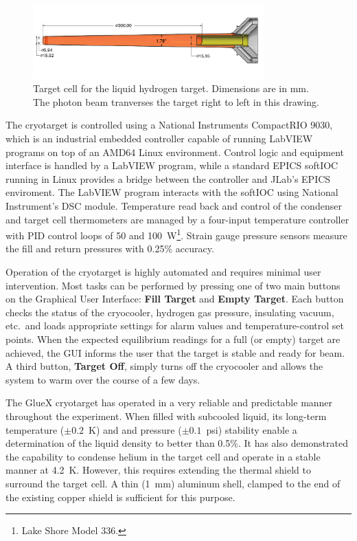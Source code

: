 \begin{figure}
\includegraphics[width=3.5in]{figures/GluexCell_mm.pdf}
\caption{Target cell for the liquid hydrogen target.  Dimensions are in mm.  The photon beam
tranverses the target right to left in this drawing.}
\label{fig:TargetCell}
\end{figure}

The cryotarget is controlled using a
National Instruments CompactRIO 9030, which is an industrial embedded controller 
capable of running LabVIEW programs on top of an AMD64 Linux environment. 
Control logic and equipment interface is handled by a LabVIEW program, 
while a standard EPICS softIOC running in Linux provides a
bridge between the controller and JLab's EPICS enviroment. The LabVIEW program interacts
with the softIOC using National Instrument's DSC module.    
Temperature read back and control of the condenser and target cell thermometers
are managed by a four-input temperature
controller with PID control loops of 50 and 100~W\footnote{Lake Shore Model 336.}.
Strain gauge pressure sensors measure the fill and return pressures with 0.25\% 
accuracy.  

Operation of the cryotarget is highly automated and requires minimal user intervention.
Most tasks can be performed by pressing one of two main buttons on
the Graphical User Interface: {\bf Fill Target} and {\bf Empty Target}.
Each button checks the status of the cryocooler, hydrogen gas pressure, insulating vacuum, etc.\
and loads appropriate settings for alarm values and temperature-control set points.  
When the expected equilibrium readings for a full (or empty) target are achieved, the
GUI informs the user that the target is stable and ready for beam.  A third button, {\bf Target Off},
simply turns off the cryocooler and allows the system to warm over the course of a few days.

The GlueX cryotarget has operated in a very reliable and predictable manner throughout the
experiment.  When filled with subcooled liquid, its long-term temperature ($\pm 0.2$~K) and
and pressure ($\pm 0.1$~psi) stability enable a determination of the liquid density to better than 0.5\%.
It has also demonstrated the capability to condense helium
in the target cell and operate in a stable manner at 4.2~K.  However, this requires extending the
thermal shield to surround the target cell. A thin (1~mm) aluminum shell, clamped to the end
of the existing copper shield is sufficient for this purpose.
